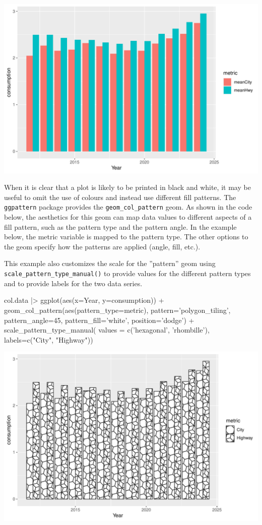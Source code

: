 \begin{center}
  \includegraphics[width=.8\textwidth]{fuel.columns.pdf}
\end{center}

When it is clear that a plot is likely to be printed in black and white, it may be useful to omit the use of colours and instead use different fill patterns. The \texttt{ggpattern} package provides the \texttt{geom\_col\_pattern} geom. As shown in the code below, the aesthetics for this geom can map data values to different aspects of a fill pattern, such as the pattern type and the pattern angle. In the example below, the metric variable is mapped to the pattern type. The other options to the geom specify how the patterns are applied (angle, fill, etc.).

This example also customizes the scale for the ''pattern'' geom using \\ \texttt{scale\_pattern\_type\_manual()} to provide values for the different pattern types and to provide labels for the two data series. 

\begin{Rcode}
col.data |> 
  ggplot(aes(x=Year, y=consumption)) +
    geom_col_pattern(aes(pattern_type=metric),
          pattern='polygon_tiling', pattern_angle=45, 
          pattern_fill='white', position='dodge') +
    scale_pattern_type_manual(
       values = c('hexagonal', 'rhombille'), 
       labels=c("City", "Highway"))
\end{Rcode}

\begin{center}
  \includegraphics[width=.8\textwidth]{fuel.columnsPatterns.pdf}
\end{center}

